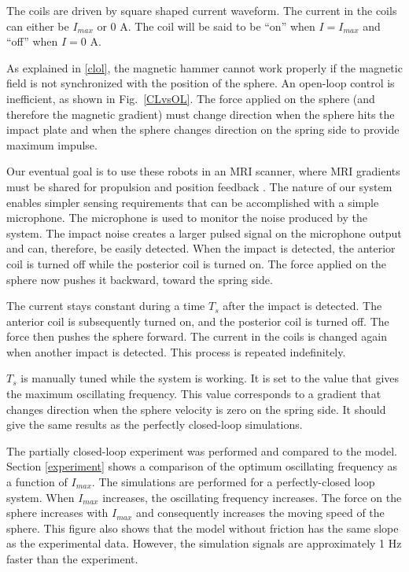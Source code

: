 \documentclass[letterpaper, 10 pt, conference]{ieeeconf}  %
\begin{document}
The coils are driven by square shaped current waveform. 
The current in the coils can either be $I_{max}$ or 0 A. 
The coil will be said to be ``on'' when $I=I_{max}$ and ``off'' when $I=0$ A.\par
As explained in \cref{clol}, the magnetic hammer cannot work properly if the magnetic field is not synchronized with the position of the sphere.
 An open-loop control is inefficient, as shown in Fig.~\ref{CLvsOL}.
  The force applied on the sphere (and therefore the magnetic gradient) must change direction when the sphere hits the impact plate and when the sphere changes direction on the spring side to provide maximum impulse.\par
Our eventual goal is to use these robots in an MRI scanner, where MRI gradients must be shared for propulsion and position feedback \cite{578}. 
The nature of our system enables simpler sensing requirements that can be accomplished with a simple microphone. 
The microphone is used to monitor the noise produced by the system. 
The impact noise creates a larger pulsed signal on the microphone output and can, therefore, be easily detected. 
When the impact is detected, the anterior coil is turned off while the posterior coil is turned on. 
The force applied on the sphere now pushes it backward, toward the spring side.\par
The current stays constant during a time $T_s$ after the impact is detected. 
The anterior coil is subsequently turned on, and the posterior coil is turned off. 
The force then pushes the sphere forward. The current in the coils is changed again when another impact is detected. 
This process is repeated indefinitely.\par
$T_s$ is manually tuned while the system is working. 
It is set to the value that gives the maximum oscillating frequency. 
This value corresponds to a gradient that changes direction when the sphere velocity is zero on the spring side. 
It should give the same results as the perfectly closed-loop simulations.\par
The partially closed-loop experiment was performed and compared to the model. 
Section \ref{experiment} shows a comparison of the optimum oscillating frequency as a function of $I_{max}$. 
The simulations are performed for a perfectly-closed loop system. 
When $I_{max}$ increases, the oscillating frequency increases. 
The force on the sphere  increases with $I_{max}$ and consequently increases the moving speed of the sphere.
This figure also shows that the model without friction has the same slope as the experimental data. 
However, the simulation signals are approximately 1 Hz faster than the experiment. 
\end{document}
